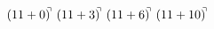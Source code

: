 \documentclass[preview]{standalone}
\begin{document}
\begin{align*}
(11+0)^{\hspace{-0.1cm}\urcorner} \ (11+3)^{\hspace{-0.1cm}\urcorner} \ (11+6)^{\hspace{-0.1cm}\urcorner} \ (11+10)^{\hspace{-0.1cm}\urcorner}
\end{align*}
\end{document}
